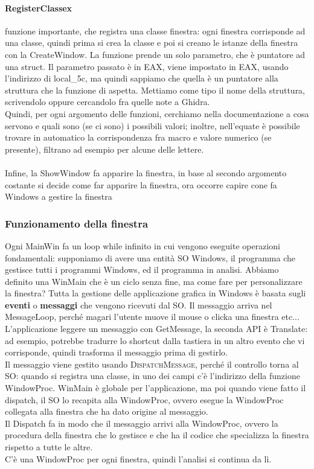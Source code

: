 \documentclass[12pt, oneside]{extbook}
\begin{document}
\paragraph{RegisterClassex} funzione importante, che registra una classe finestra: ogni finestra corrisponde ad una classe, quindi prima si crea la classe e poi si creano le istanze della finestra con la CreateWindow. La funzione prende un solo parametro, che è puntatore ad una struct. Il parametro passato è in EAX, viene impostato in EAX, usando l'indirizzo di local\_5c, ma quindi sappiamo che quella è un puntatore alla struttura che la funzione di aspetta. Mettiamo come tipo il nome della struttura, scrivendolo oppure cercandolo fra quelle note a Ghidra.\\ Quindi, per ogni argomento delle funzioni, cerchiamo nella documentazione a cosa servono e quali sono (se ci sono) i possibili valori; inoltre, nell'equate è possibile trovare in automatico la corrispondenza fra macro e valore numerico (se presente), filtrano ad esempio per alcune delle lettere.
\\\\ Infine, la ShowWindow fa apparire la finestra, in base al secondo argomento costante si decide come far apparire la finestra, ora occorre capire cone fa Windows a gestire la finestra
\subsubsection{Funzionamento della finestra}
Ogni MainWin fa un loop while infinito in cui vengono eseguite  operazioni fondamentali: supponiamo di avere una entità SO Windows, il programma che gestisce tutti i programmi Windows, ed il programma in analisi. Abbiamo definito una WinMain che è un ciclo senza fine, ma come fare per personalizzare la finestra? Tutta la gestione delle applicazione grafica in Windows è basata sugli \textbf{eventi} o  \textbf{messaggi} che vengono ricevuti dal SO. Il messaggio arriva nel MessageLoop, perché magari l'utente muove il mouse o clicka una finestra etc...\\ L'applicazione leggere un messaggio con \textsf{GetMessage}, la seconda API è \textsf{Translate}: ad esempio, potrebbe tradurre lo shortcut dalla tastiera in un altro evento che vi corrisponde, quindi trasforma il messaggio prima di gestirlo.\\ Il messaggio viene gestito usando \textsc{DispatchMessage}, perché il controllo torna al SO: quando si registra una classe, in uno dei campi c'è l'indirizzo della funzione WindowProc. WinMain è globale per l'applicazione, ma poi quando viene fatto il dispatch, il SO lo recapita alla WindowProc, ovvero esegue la WindowProc collegata alla finestra che ha dato origine al messaggio.\\ Il Dispatch fa in modo che il messaggio arrivi alla WindowProc, ovvero la procedura della finestra che lo gestisce e che ha il codice che specializza la finestra rispetto a tutte le altre.\\ C'è una WindowProc per ogni finestra, quindi l'analisi si continua da lì.
\end{document}
